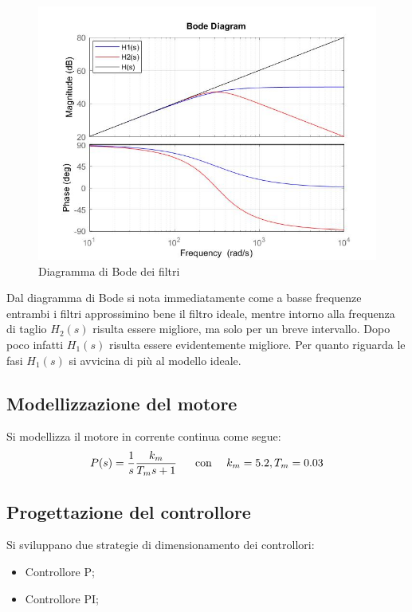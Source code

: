 \documentclass[a4paper,11pt, Arial]{article}
\begin{document}
\begin{figure}[H]
\centering
\includegraphics[scale=0.3]{BODEH.jpg}
\caption{Diagramma di Bode dei filtri}
\end{figure}

Dal diagramma di Bode si nota immediatamente come a basse frequenze entrambi i filtri approssimino bene il filtro ideale, mentre intorno alla frequenza di taglio $H_2(s)$ risulta essere migliore, ma solo per un breve intervallo. Dopo poco infatti $H_1(s)$ risulta essere evidentemente migliore.
Per quanto riguarda le fasi $H_1(s)$  si avvicina di più al modello ideale.

\subsection{Modellizzazione del motore}
Si modellizza il motore in corrente continua come segue: 
\begin{equation}
P(s)=\frac{1}{s}\frac{k_m}{T_m s + 1} \text{ \hspace{10 pt} con \hspace{10 pt}} k_m=5.2, T_m=0.03
\end{equation}

\subsection{Progettazione del controllore}
Si sviluppano due strategie di dimensionamento dei controllori:
\begin{itemize}
  \item Controllore P; 
  \item Controllore PI;
\end{itemize}
\end{document}
